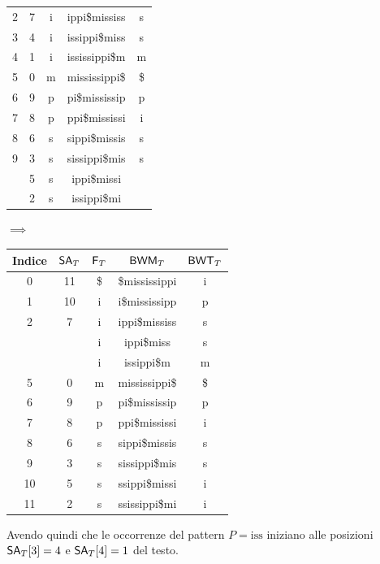 \begin{esempio}
\begin{table}[H]
\begin{tabular}{c|c|c|c|c}
      2 & 7 & i & ippi\$mississ & s\\
      3 & 4 & i & issippi\$miss & s\\
      4 & 1 & i & ississippi\$m & m\\
      5 & 0 & m & mississippi\$ & \$\\
      6 & 9 & p & pi\$mississip & p\\
      7 & 8 & p & ppi\$mississi & i\\
      8 & 6 & s & sippi\$missis & s\\
      9 & 3 & s & sissippi\$mis & s\\
      {\color{nordred}{10}} & 5 & s & {\color{nordred}{ss}}ippi\$missi
      & {\color{nordgreen}{i}}\\
      {\color{nordred}{11}} & 2 & s & {\color{nordred}{ss}}issippi\$mi
      & {\color{nordgreen}{i}}\\
    \end{tabular}
    $\implies$
    \begin{tabular}{c|c|c|c|c} 
      \textbf{Indice} & $\mbox{\rm {\sf SA}}_T$ & $\mbox{\rm {\sf F}}_T$ & $\mbox{\rm {\sf BWM}}_T$
      & $\mbox{\rm {\sf BWT}}_T$\\ 
      \hline
      0 & 11 & \$ & \$mississippi & i\\
      1 & 10 & i & i\$mississipp & p\\
      2 & 7 & i & ippi\$mississ & s\\
      {\color{nordred}{3}} & {\color{nordgreen}{\underline{4}}} & i
                                        & {\color{nordred}{iss}}ippi\$miss & s\\
      {\color{nordred}{4}} & {\color{nordgreen}{\underline{1}}} & i
                                        & {\color{nordred}{iss}}issippi\$m & m\\
      5 & 0 & m & mississippi\$ & \$\\
      6 & 9 & p & pi\$mississip & p\\
      7 & 8 & p & ppi\$mississi & i\\
      8 & 6 & s & sippi\$missis & s\\
      9 & 3 & s & sissippi\$mis & s\\
      10 & 5 & s & ssippi\$missi & i\\
      11 & 2 & s & ssissippi\$mi & i\\
    \end{tabular}
  \end{table}
  Avendo quindi che le occorrenze del pattern $P=\mbox{iss}$ iniziano alle
  posizioni $\mbox{\rm {\sf SA}}_T[3]=4$ e $\mbox{\rm {\sf SA}}_T[4]=1$ del testo.
\end{esempio}
